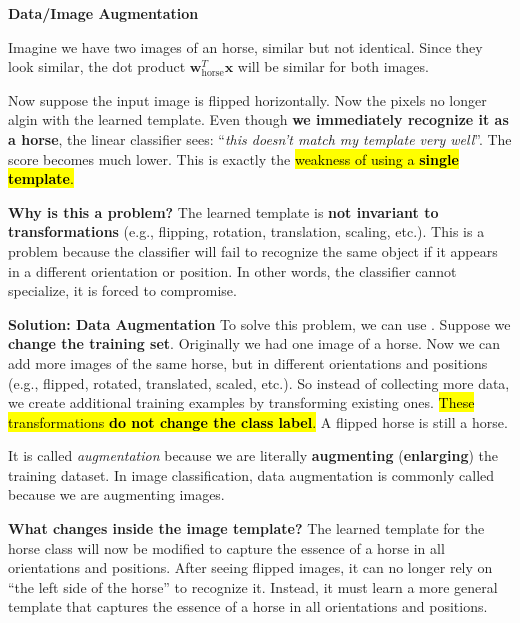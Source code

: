 \newpage

\begin{flushleft}
    \textcolor{Green3}{ \textbf{Data/Image Augmentation}}\label{def:data-augmentation}
\end{flushleft}
Imagine we have two images of an horse, similar but not identical. Since they look similar, the dot product $\mathbf{w}_{\text{horse}}^{T} \mathbf{x}$ will be similar for both images.

\highspace
Now suppose the input image is flipped horizontally. Now the pixels no longer algin with the learned template. Even though \textbf{we immediately recognize it as a horse}, the linear classifier sees: ``\emph{this doesn't match my template very well}''. The score becomes much lower. This is exactly the \hl{weakness of using a \textbf{single template}.}

\highspace
\textcolor{Red2}{ \textbf{Why is this a problem?}} The learned template is \textbf{not invariant to transformations} (e.g., flipping, rotation, translation, scaling, etc.). This is a problem because the classifier will fail to recognize the same object if it appears in a different orientation or position. In other words, the classifier cannot specialize, it is forced to compromise.

\highspace
\textcolor{Green3}{ \textbf{Solution: Data Augmentation}} To solve this problem, we can use . Suppose we \textbf{change the training set}. Originally we had one image of a horse. Now we can add more images of the same horse, but in different orientations and positions (e.g., flipped, rotated, translated, scaled, etc.). So instead of collecting more data, we create additional training examples by transforming existing ones. \hl{These transformations \textbf{do not change the class label}.} A flipped horse is still a horse.

\highspace
It is called \emph{augmentation} because we are literally \textbf{augmenting} (\textbf{enlarging}) the training dataset. In image classification, data augmentation is commonly called  because we are augmenting images.

\highspace
\textcolor{Green3}{ \textbf{What changes inside the image template?}} The learned template for the horse class will now be modified to capture the essence of a horse in all orientations and positions. After seeing flipped images, it can no longer rely on ``the left side of the horse'' to recognize it. Instead, it must learn a more general template that captures the essence of a horse in all orientations and positions.

